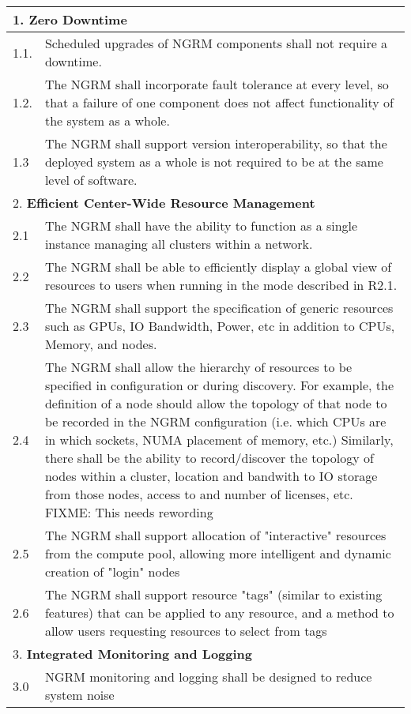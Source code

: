 \begin{longtable}{|p{1cm}|p{15cm}|}\hline
  \multicolumn{2}{|l|}{1. \textbf{Zero Downtime}} \\
  \hline
  1.1. & Scheduled upgrades of NGRM components shall not require a downtime.\\
  \hline
  1.2. & The NGRM shall incorporate fault tolerance at every level, so
	that a failure of one component does not affect functionality of the
	system as a whole.\\
  \hline
  1.3 & The NGRM shall support version interoperability, so that the
	deployed system as a whole is not required to be at the same level
	of software.\\
  \hline
  \multicolumn{2}{|l|}{2. \textbf{Efficient Center-Wide Resource Management}} \\
  \hline
  2.1 & The NGRM shall have the ability to function as a single instance
	managing all clusters within a network. \\
  \hline
  2.2 & The NGRM shall be able to efficiently display a global view of
	resources to users when running in the mode described in R2.1.\\
  \hline
  2.3 & The NGRM shall support the specification of generic resources such
	as GPUs, IO Bandwidth, Power, etc in addition to CPUs, Memory,
	and nodes. \\
  \hline
  2.4 & The NGRM shall allow the hierarchy of resources to be specified in
	configuration or during discovery. For example, the definition of
	a node should allow the topology of that node to be recorded in
	the NGRM configuration (i.e. which CPUs are in which sockets,
	NUMA placement of memory, etc.) Similarly, there shall be the
	ability to record/discover the topology of nodes within a cluster,
	location and bandwith to IO storage from those nodes, access to
	and number of licenses, etc. FIXME: This needs rewording\\
  \hline
  2.5 & The NGRM shall support allocation of "interactive" resources from
	the compute pool, allowing more intelligent and dynamic creation
	of "login" nodes\\
  \hline
  2.6 & The NGRM shall support resource "tags" (similar to existing features)
	that can be applied to any resource, and a method to allow users
	requesting resources to select from tags\\
  \hline
  \multicolumn{2}{|l|}{3. \textbf{Integrated Monitoring and Logging}} \\
  \hline
  3.0 & NGRM monitoring and logging shall be designed to reduce system noise

\end{longtable}
